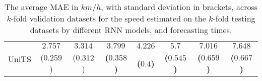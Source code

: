 \begin{table}[!ht]
{\begin{tabular}{|c|c|c|c|c|c|c|c|}
			\multirow{2}{*}{UniTS} & $2.757$ & $3.314$ & $\mathbf{3.799}$ & $\mathbf{4.226}$ & $\mathbf{5.7}$ & $\mathbf{7.016}$ & $\mathbf{7.648}$ \\
			 & ($0.259$) & ($0.312$) & \textbf{(}$\mathbf{0.358}$\textbf{)} & \textbf{(}$\mathbf{0.4}$\textbf{)} & \textbf{(}$\mathbf{0.545}$\textbf{)} & \textbf{(}$\mathbf{0.659}$\textbf{)} & \textbf{(}$\mathbf{0.667}$\textbf{)} \\ \hline
		\end{tabular}
	}
	\caption{The average MAE in $km/h$, with standard deviation in brackets, across $k$-fold validation datasets for the speed estimated on the $k$-fold testing datasets by different RNN models, and forecasting times.}
	\label{tab:all_speed_MAE}
\end{table}